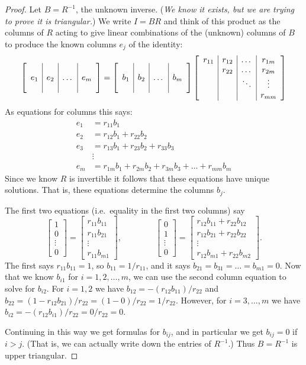 \documentclass[11pt]{amsart}
\begin{document}
\begin{proof}  Let $B=R^{-1}$, the unknown inverse.  (\emph{We know it exists, but we are trying to prove it is triangular.})  We write $I=BR$ and think of this product as the columns of $R$ acting to give linear combinations of the (unknown) columns of $B$ to produce the known columns $e_j$ of the identity:
$$\left[\begin{array}{c|c|c|c} & & & \\ e_1 & e_2 & \dots & e_m \\ & & & \end{array}\right] = \left[\begin{array}{c|c|c|c} & & & \\ b_1 & b_2 & \dots & b_m \\ & & & \end{array}\right] \left[\begin{array}{c|c|c|c} r_{11} & r_{12} & \dots & r_{1m} \\  & r_{22} & \dots & r_{2m} \\ & & \ddots & \vdots \\  & & & r_{mm}\end{array}\right]$$
As equations for columns this says:
\begin{align*}
e_1 &= r_{11} b_1 \\
e_2 &= r_{12} b_1 + r_{22} b_2 \\
e_3 &= r_{13} b_1 + r_{23} b_2 + r_{33} b_3 \\
&\vdots \\
e_m &= r_{1m} b_1 + r_{2m} b_2 + r_{3m} b_3 + \dots + r_{mm} b_m
\end{align*}
Since we know $R$ is invertible it follows that these equations have unique solutions.  That is, these equations determine the columns $b_j$.

The first two equations (i.e.~equality in the first two columns) say
    $$\begin{bmatrix} 1 \\ 0 \\ \vdots \\ 0 \end{bmatrix} = \begin{bmatrix} r_{11} b_{11} \\ r_{11} b_{21} \\ \vdots \\ r_{11} b_{m1} \end{bmatrix}, \qquad \qquad \begin{bmatrix} 0 \\ 1 \\ \vdots \\ 0 \end{bmatrix} = \begin{bmatrix} r_{12} b_{11} + r_{22} b_{12} \\  r_{12} b_{21} + r_{22} b_{22} \\ \vdots \\ r_{12} b_{m1} + r_{22} b_{m2} \end{bmatrix}.$$
The first says $r_{11} b_{11} = 1$, so $b_{11} = 1/r_{11}$, and it says $b_{21}=b_{31}= \dots =b_{m1}=0$.  Now that we know $b_{i1}$ for $i=1,2,\dots,m$, we can use the second column equation to solve for $b_{i2}$.  For $i=1,2$ we have $b_{12} = - (r_{12} b_{11}) / r_{22}$ and $b_{22} = (1 - r_{12} b_{21}) / r_{22} = (1 - 0) / r_{22} = 1/r_{22}$.  However, for $i=3,\dots,m$ we have $b_{i2}=- (r_{12} b_{i1}) / r_{22} = 0 / r_{22} = 0$.

Continuing in this way we get formulas for $b_{ij}$, and in particular we get $b_{ij}=0$ if $i>j$.  (That is, we can actually write down the entries of $R^{-1}$.)  Thus $B=R^{-1}$ is upper triangular.\end{proof}
\end{document}
